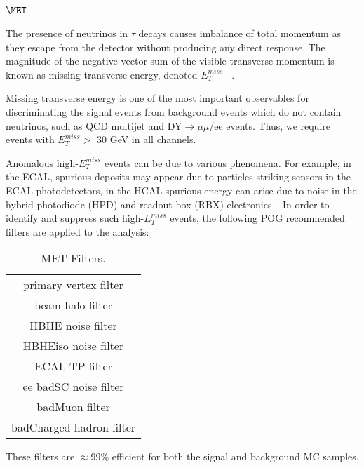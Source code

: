 \subsection{\texorpdfstring{$\MET$}{Missing transverse energy}}\label{ss:met}
 
The presence of neutrinos in $\tau$ decays causes imbalance of total momentum as they 
escape from the detector without producing any direct response. The magnitude of the 
negative vector sum of the visible transverse momentum is known as missing transverse 
energy, denoted $E^{miss}_{T}$ ~\cite{MET}.

Missing transverse energy is one of the most important observables for discriminating 
the signal events from background events which do not contain neutrinos, such as QCD 
multijet and DY$\to\mu\mu$/ee events. Thus, we require events with $E^{miss}_{T} >$ 
30 GeV in all channels.

Anomalous high-$E^{miss}_{T}$ events can be due to various phenomena. For example, in 
the ECAL, spurious deposits may appear due to particles striking sensors in the ECAL 
photodetectors, in the HCAL spurious energy can arise due to noise in the hybrid 
photodiode (HPD) and readout box (RBX) electronics~\cite{METFilters}. In order to identify and suppress 
such high-$E^{miss}_{T}$ events, the following POG recommended filters are applied to 
the analysis:
\begin{table}[ht]
\begin{center}
 \caption{MET Filters.\label{tab:metFilter}}
 \begin{tabular}{|c|}
 \hline\hline
       primary vertex filter \\
       beam halo filter	\\
       HBHE noise filter \\
       HBHEiso noise filter	\\
       ECAL TP filter \\
       ee badSC noise filter \\
       badMuon filter\\
       badCharged hadron filter\\
 \hline
 \hline
 \end{tabular}
\end{center}
\end{table}

These filters are $\approx 99$\% efficient for both the signal and background MC samples.
